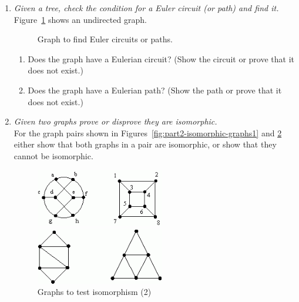 \documentclass[a4paper,12pt]{article}
\begin{document}
\begin{enumerate}
\item {\small \em  Given a tree, check the condition for a Euler circuit (or path) and find it.}\\
Figure~\ref{fig:part2-eulerian-graph} shows an undirected graph. 
\begin{figure}[!htb]
\caption{\label{fig:part2-eulerian-graph} Graph to find Euler circuits or paths.}
\end{figure}
\begin{enumerate}
\item Does the graph have a Eulerian circuit? (Show the circuit or prove that it does
not exist.)
\item Does the graph have a Eulerian path? (Show the path or prove that it does
not exist.)
\end{enumerate}





\item {\small \em  Given two graphs prove or disprove they are isomorphic.}\\
For the graph pairs shown in Figures~\ref{fig:part2-isomorphic-graphs1} and 
\ref{fig:part2-isomorphic-graphs2} either show that both 
graphs in a pair are isomorphic, or show that they cannot be isomorphic.
\begin{figure}[!htb]
\centering
\begin{minipage}{.5\textwidth}
\centering
\includegraphics[width=2.2in]{figs/part2-isomorphic-graphs1.png}
\caption{Graphs to test isomorphism (1)}
\label{fig:part2-isomorphic-graphs1}
\end{minipage}%
\begin{minipage}{0.5\textwidth}
\centering
\includegraphics[width=2.2in]{figs/part2-isomorphic-graphs2.png}
\caption{Graphs to test isomorphism (2)}
\label{fig:part2-isomorphic-graphs2}
\end{minipage}
\end{figure}
\end{enumerate}
\end{document}
